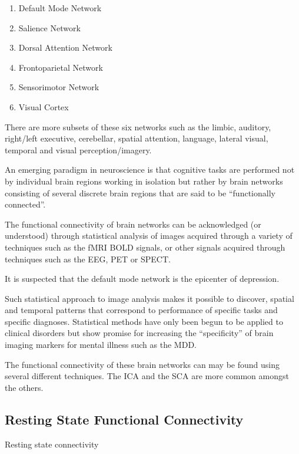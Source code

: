 \documentclass{article}
\begin{document}
\begin{enumerate}[nosep]
  \item Default Mode Network
  \item Salience Network
  \item Dorsal Attention Network
  \item Frontoparietal Network
  \item Sensorimotor Network
  \item Visual Cortex
\end{enumerate}

There are more subsets of these six networks such as the limbic,
auditory, right/left executive, cerebellar, spatial attention,
language, lateral visual, temporal and visual perception/imagery.

An emerging paradigm in neuroscience is that cognitive tasks are
performed not by individual brain regions working in isolation but
rather by brain networks consisting of several discrete brain regions
that are said to be ``functionally connected''.

The functional connectivity of brain networks can be acknowledged (or
understood) through statistical analysis of images acquired through a
variety of techniques such as the fMRI BOLD signals, or other signals
acquired through techniques such as the EEG, PET or SPECT.

It is suspected that the default mode network is the epicenter of
depression.

Such statistical approach to image analysis makes it possible to
discover, spatial and temporal patterns that correspond to performance
of specific tasks and specific diagnoses. Statistical methods have
only been begun to be applied to clinical disorders but show promise
for increasing the ``specificity'' of brain imaging markers for mental
illness such as the MDD.

The functional connectivity of these brain networks can may be found
using several different techniques. The ICA and the SCA are more
common amongst the others.

\subsection{Resting State Functional Connectivity}

Resting state connectivity
\end{document}
